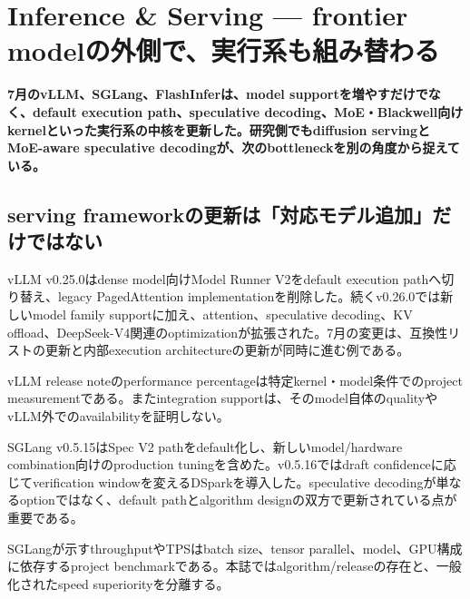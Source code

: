 \section{Inference \& Serving — frontier modelの外側で、実行系も組み替わる}
\label{pkg:inference-serving-july}
\noindent\textbf{7月のvLLM、SGLang、FlashInferは、model supportを増やすだけでなく、default execution path、speculative decoding、MoE・Blackwell向けkernelといった実行系の中核を更新した。研究側でもdiffusion servingとMoE-aware speculative decodingが、次のbottleneckを別の角度から捉えている。}\autocite{src-50e29a09d75a,src-5a9041d41ad0,src-76c7b104c7df,src-b80517d03022}

\subsection{serving frameworkの更新は「対応モデル追加」だけではない}

vLLM v0.25.0はdense model向けModel Runner V2をdefault execution pathへ切り替え、legacy PagedAttention implementationを削除した。続くv0.26.0では新しいmodel family supportに加え、attention、speculative decoding、KV offload、DeepSeek-V4関連のoptimizationが拡張された。7月の変更は、互換性リストの更新と内部execution architectureの更新が同時に進む例である。\autocite{src-76c7b104c7df,src-b811cc97eff4}


\begin{claimboundary}
vLLM release noteのperformance percentageは特定kernel・model条件でのproject measurementである。またintegration supportは、そのmodel自体のqualityやvLLM外でのavailabilityを証明しない。\autocite{src-76c7b104c7df,src-b811cc97eff4}
\end{claimboundary}

SGLang v0.5.15はSpec V2 pathをdefault化し、新しいmodel/hardware combination向けのproduction tuningを含めた。v0.5.16ではdraft confidenceに応じてverification windowを変えるDSparkを導入した。speculative decodingが単なるoptionではなく、default pathとalgorithm designの双方で更新されている点が重要である。\autocite{src-5a9041d41ad0,src-bf2a6d1b9b56}


\begin{claimboundary}
SGLangが示すthroughputやTPSはbatch size、tensor parallel、model、GPU構成に依存するproject benchmarkである。本誌ではalgorithm/releaseの存在と、一般化されたspeed superiorityを分離する。\autocite{src-5a9041d41ad0,src-bf2a6d1b9b56}
\end{claimboundary}

